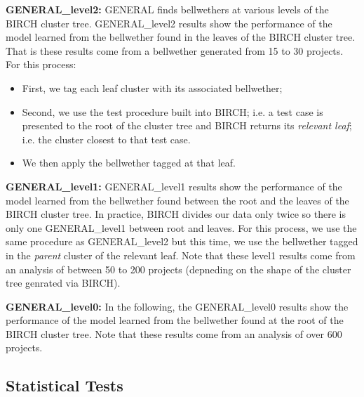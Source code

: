 \documentclass[10pt,journal,compsoc]{IEEEtran}
\newcommand{\bi}{\begin{itemize}}
\newcommand{\ei}{\end{itemize}}
\begin{document}
\textbf{GENERAL\_level2:}  GENERAL finds bellwethers at various levels of the BIRCH cluster tree.  GENERAL\_level2 results show the performance of the model learned from the bellwether found in the leaves of the  BIRCH cluster tree.
That is these results come from  a bellwether generated from 15 to 30 projects.  
For this process:
\bi
\item
First, we tag each leaf cluster with its associated bellwether;
\item
Second, we use the test procedure built into BIRCH; i.e. a test case is presented to the root
of the cluster tree and BIRCH returns its {\em relevant  leaf};
i.e. the cluster closest to that test case.
\item
We then apply the bellwether tagged at that leaf.
\ei
\textbf{GENERAL\_level1:}  GENERAL\_level1 results show the performance of the model learned from the bellwether found between the root and   the leaves of the  BIRCH cluster tree. In practice, BIRCH divides our data only twice
so there is only one GENERAL\_level1  between root and leaves. For this process,
we use the same procedure as GENERAL\_level2 but this time, we use the bellwether tagged in the {\em parent}
cluster of the relevant leaf. Note that these level1 results come from an analysis of between 50 to 200  projects
(depneding on the shape of the cluster tree genrated via BIRCH). 



\textbf{GENERAL\_level0:}  
In the following,  the  GENERAL\_level0 results show the performance of the model learned from the bellwether found at the root of the BIRCH cluster tree. Note that these results come from an analysis of over 600 projects. 

 
\subsection{Statistical Tests}
\label{stats}\label{eval}
\end{document}
